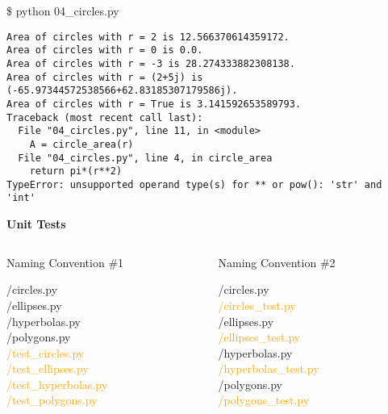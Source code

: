 \documentclass{beamer}
\begin{document}
\begin{frame}[fragile]{}
\small{\$ python 04\_circles.py} \par \vspace{-.5em}
\begin{verbatim}
Area of circles with r = 2 is 12.566370614359172.
Area of circles with r = 0 is 0.0.
Area of circles with r = -3 is 28.274333882308138.
Area of circles with r = (2+5j) is (-65.97344572538566+62.83185307179586j).
Area of circles with r = True is 3.141592653589793.
Traceback (most recent call last):
  File "04_circles.py", line 11, in <module>
    A = circle_area(r)
  File "04_circles.py", line 4, in circle_area
    return pi*(r**2)
TypeError: unsupported operand type(s) for ** or pow(): 'str' and 'int'
\end{verbatim}
\centerline{\small{\textbf{Unit Tests}}}
\begin{columns}[t]
\hspace{2cm}
\begin{column}{.3\textwidth}
\footnotesize{Naming Convention \#1} \par \vspace{5pt}
\footnotesize{
/circles.py\\
/ellipses.py\\
/hyperbolas.py\\
/polygons.py\\
\textcolor{orange}{
/test\_circles.py\\
/test\_ellipses.py\\
/test\_hyperbolas.py\\
/test\_polygons.py\\}
}
\end{column}
\begin{column}{.5\textwidth}
\footnotesize{Naming Convention \#2} \par \vspace{5pt}
\footnotesize{
/circles.py\\
\textcolor{orange}{/circles\_test.py}\\
/ellipses.py\\
\textcolor{orange}{/ellipses\_test.py}\\
/hyperbolas.py\\
\textcolor{orange}{/hyperbolas\_test.py}\\
/polygons.py\\
\textcolor{orange}{/polygons\_test.py}
}
\end{column}
\end{columns}
\end{frame}
\end{document}
